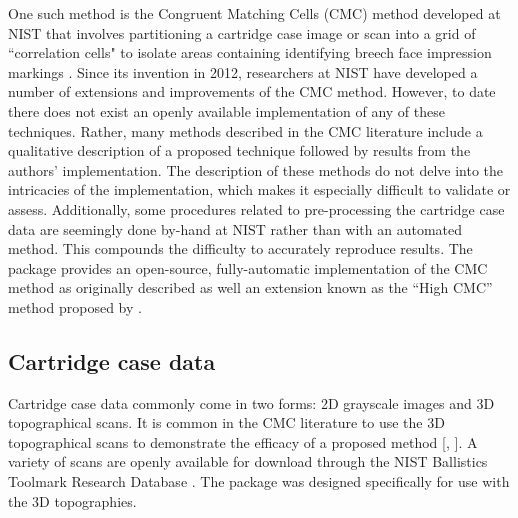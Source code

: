 One such method is the Congruent Matching Cells (CMC) method developed
at NIST that involves partitioning a cartridge case image or scan into a
grid of ``correlation cells" to isolate areas containing identifying
breech face impression markings \citep{song_proposed_2013}. Since its
invention in 2012, researchers at NIST have developed a number of
extensions and improvements of the CMC method. However, to date there
does not exist an openly available implementation of any of these
techniques. Rather, many methods described in the CMC literature include
a qualitative description of a proposed technique followed by results
from the authors' implementation. The description of these methods do
not delve into the intricacies of the implementation, which makes it
especially difficult to validate or assess. Additionally, some
procedures related to pre-processing the cartridge case data are
seemingly done by-hand at NIST rather than with an automated method.
This compounds the difficulty to accurately reproduce results. The
 package provides an open-source, fully-automatic
implementation of the CMC method as originally described as well an
extension known as the ``High CMC'' method proposed by
\citet{tong_improved_2015}.

\hypertarget{data}{%
\subsection{Cartridge case data}\label{data}}

Cartridge case data commonly come in two forms: 2D grayscale images and
3D topographical scans. It is common in the CMC literature to use the 3D
topographical scans to demonstrate the efficacy of a proposed method
{[}\citep{tong_improved_2015}, \citep{chen_convergence_2017}{]}. A
variety of scans are openly available for download through the NIST
Ballistics Toolmark Research Database \citep{nbtrd}. The 
package was designed specifically for use with the 3D topographies.

